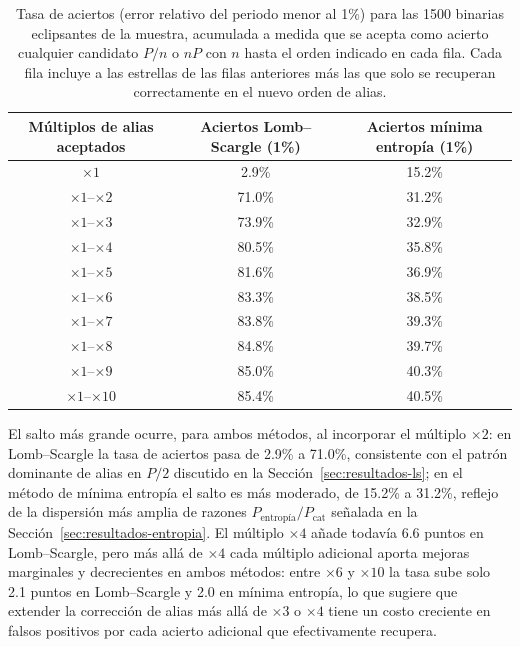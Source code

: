 \documentclass[12pt,letterpaper,oneside]{book}
\begin{document}
\begin{table}[H]
	\centering
	\begin{tabular}{ccc}
		\hline
		\textbf{M\'ultiplos de alias aceptados} & \textbf{Aciertos Lomb--Scargle (1\%)} & \textbf{Aciertos m\'inima entrop\'ia (1\%)} \\
		\hline
		$\times1$ & 2.9\% & 15.2\% \\
		$\times1$--$\times2$ & 71.0\% & 31.2\% \\
		$\times1$--$\times3$ & 73.9\% & 32.9\% \\
		$\times1$--$\times4$ & 80.5\% & 35.8\% \\
		$\times1$--$\times5$ & 81.6\% & 36.9\% \\
		$\times1$--$\times6$ & 83.3\% & 38.5\% \\
		$\times1$--$\times7$ & 83.8\% & 39.3\% \\
		$\times1$--$\times8$ & 84.8\% & 39.7\% \\
		$\times1$--$\times9$ & 85.0\% & 40.3\% \\
		$\times1$--$\times10$ & 85.4\% & 40.5\% \\
		\hline
	\end{tabular}
	\caption[Aciertos acumulados por orden de alias para binarias, Lomb--Scargle y m\'inima entrop\'ia]{Tasa de aciertos (error relativo del periodo menor al 1\%) para las 1500 binarias eclipsantes de la muestra, acumulada a medida que se acepta como acierto cualquier candidato $P/n$ o $nP$ con $n$ hasta el orden indicado en cada fila. Cada fila incluye a las estrellas de las filas anteriores m\'as las que solo se recuperan correctamente en el nuevo orden de alias.}
	\label{tab:binarias-aciertos-alias}
\end{table}

El salto m\'as grande ocurre, para ambos m\'etodos, al incorporar el m\'ultiplo $\times2$: en Lomb--Scargle la tasa de aciertos pasa de 2.9\% a 71.0\%, consistente con el patr\'on dominante de alias en $P/2$ discutido en la Secci\'on~\ref{sec:resultados-ls}; en el m\'etodo de m\'inima entrop\'ia el salto es m\'as moderado, de 15.2\% a 31.2\%, reflejo de la dispersi\'on m\'as amplia de razones $P_{\text{entrop\'ia}}/P_{\text{cat}}$ se\~nalada en la Secci\'on~\ref{sec:resultados-entropia}. El m\'ultiplo $\times4$ a\~nade todav\'ia 6.6 puntos en Lomb--Scargle, pero m\'as all\'a de $\times4$ cada m\'ultiplo adicional aporta mejoras marginales y decrecientes en ambos m\'etodos: entre $\times6$ y $\times10$ la tasa sube solo 2.1 puntos en Lomb--Scargle y 2.0 en m\'inima entrop\'ia, lo que sugiere que extender la correcci\'on de alias m\'as all\'a de $\times3$ o $\times4$ tiene un costo creciente en falsos positivos por cada acierto adicional que efectivamente recupera.
\end{document}
